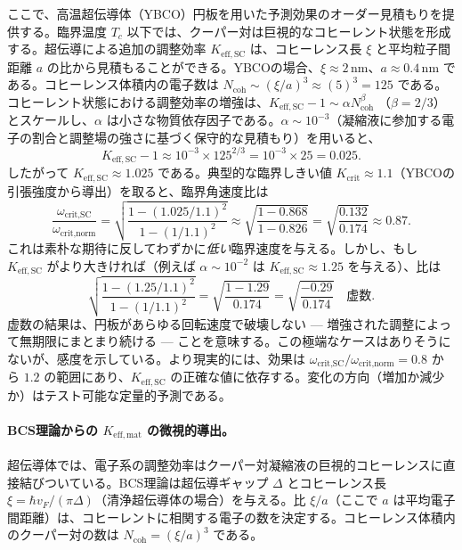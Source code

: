 \documentclass[12pt,a4paper]{article}
\newcommand{\betaf}{\beta}
\begin{document}
	ここで、高温超伝導体（YBCO）円板を用いた予測効果のオーダー見積もりを提供する。臨界温度 \(T_c\) 以下では、クーパー対は巨視的なコヒーレント状態を形成する。超伝導による追加の調整効率 \(K_{\mathrm{eff,SC}}\) は、コヒーレンス長 \(\xi\) と平均粒子間距離 \(a\) の比から見積もることができる。YBCOの場合、\(\xi \approx 2\,\text{nm}\)、\(a \approx 0.4\,\text{nm}\) である。コヒーレンス体積内の電子数は \(N_{\text{coh}} \sim (\xi/a)^3 \approx (5)^3 = 125\) である。コヒーレント状態における調整効率の増強は、\(K_{\mathrm{eff,SC}} - 1 \sim \alpha N_{\text{coh}}^{\betaf}\) （\(\betaf = 2/3\)）とスケールし、\(\alpha\) は小さな物質依存因子である。\(\alpha \sim 10^{-3}\)（凝縮液に参加する電子の割合と調整場の強さに基づく保守的な見積もり）を用いると、
	\[
	K_{\mathrm{eff,SC}} - 1 \approx 10^{-3} \times 125^{2/3} = 10^{-3} \times 25 = 0.025.
	\]
	したがって \(K_{\mathrm{eff,SC}} \approx 1.025\) である。典型的な臨界しきい値 \(K_{\mathrm{crit}} \approx 1.1\)（YBCOの引張強度から導出）を取ると、臨界角速度比は
	\[
	\frac{\omega_{\text{crit,SC}}}{\omega_{\text{crit,norm}}} = \sqrt{ \frac{1 - (1.025/1.1)^2}{1 - (1/1.1)^2} } \approx \sqrt{ \frac{1 - 0.868}{1 - 0.826} } = \sqrt{ \frac{0.132}{0.174} } \approx 0.87.
	\]
	これは素朴な期待に反してわずかに\textit{低い}臨界速度を与える。しかし、もし \(K_{\mathrm{eff,SC}}\) がより大きければ（例えば \(\alpha \sim 10^{-2}\) は \(K_{\mathrm{eff,SC}} \approx 1.25\) を与える）、比は
	\[
	\sqrt{ \frac{1 - (1.25/1.1)^2}{1 - (1/1.1)^2} } = \sqrt{ \frac{1 - 1.29}{0.174} } = \sqrt{ \frac{-0.29}{0.174} } \quad \text{虚数}.
	\]
	虚数の結果は、円板があらゆる回転速度で破壊しない — 増強された調整によって無期限にまとまり続ける — ことを意味する。この極端なケースはありそうにないが、感度を示している。より現実的には、効果は \(\omega_{\text{crit,SC}}/\omega_{\text{crit,norm}} = 0.8\) から \(1.2\) の範囲にあり、\(K_{\mathrm{eff,SC}}\) の正確な値に依存する。変化の方向（増加か減少か）はテスト可能な定量的予測である。
	
	\paragraph{BCS理論からの \(K_{\mathrm{eff,mat}}\) の微視的導出。}
	超伝導体では、電子系の調整効率はクーパー対凝縮液の巨視的コヒーレンスに直接結びついている。BCS理論は超伝導ギャップ \(\Delta\) とコヒーレンス長 \(\xi = \hbar v_F / (\pi \Delta)\)（清浄超伝導体の場合）を与える。比 \(\xi / a\)（ここで \(a\) は平均電子間距離）は、コヒーレントに相関する電子の数を決定する。コヒーレンス体積内のクーパー対の数は \(N_{\text{coh}} = (\xi/a)^3\) である。
	
\end{document}
